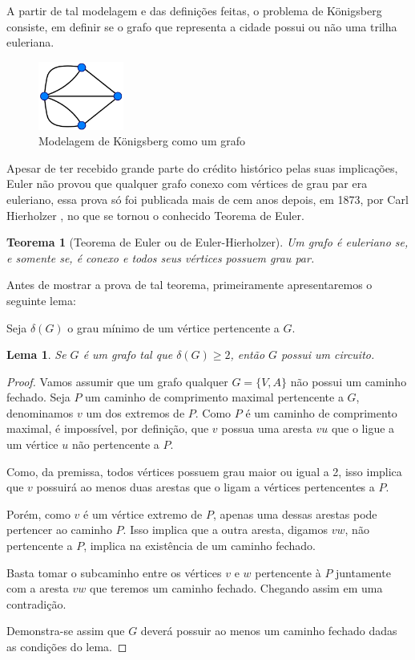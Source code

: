 \documentclass{article}
\newtheorem{theorem}{Teorema}[section]
\newtheorem{lemma}{Lema}
\begin{document}
A partir de tal modelagem e das definições feitas, o problema de Königsberg consiste, em definir se o grafo que representa a cidade possui ou não uma trilha euleriana. 


\begin{figure}
    \centering
    \includegraphics[width=0.25\textwidth]{konigsberg-graph.png}
    \caption{Modelagem de Königsberg como um grafo}
    \label{konigsberg-graph}
\end{figure}

Apesar de ter recebido grande parte do crédito histórico pelas suas implicações, Euler não provou que qualquer grafo conexo com vértices de grau par era euleriano, essa prova só foi publicada mais de cem anos depois, em 1873, por Carl Hierholzer \cite{hierholzer}, no que se tornou o conhecido Teorema de Euler.


\begin{theorem}[Teorema de Euler ou de Euler-Hierholzer]
    Um grafo é euleriano se, e somente se, é conexo e todos seus vértices possuem grau par.
    \label{euler}
\end{theorem}

Antes de mostrar a prova de tal teorema, primeiramente apresentaremos o seguinte lema:

Seja $\delta(G)$ o grau mínimo de um vértice pertencente a $G$.

\begin{lemma}
	\label{lema}
	Se $G$ é um grafo tal que $\delta(G) \geq 2$, então $G$ possui um circuito.
\end{lemma}

\begin{proof}
	Vamos assumir que um grafo qualquer $G = \{V, A\}$ não possui um caminho fechado. 
	Seja $P$ um caminho de comprimento maximal pertencente a $G$, denominamos $v$ um dos extremos de $P$. 
	Como $P$ é um caminho de comprimento maximal, é impossível, por definição, que $v$ possua uma aresta $vu$ que o ligue a um vértice $u$ não pertencente a $P$.
	
	Como, da premissa, todos vértices possuem grau maior ou igual a 2, isso implica que $v$ possuirá ao menos duas arestas que o ligam a vértices pertencentes a $P$.

	Porém, como $v$ é um vértice extremo de $P$, apenas uma dessas arestas pode pertencer ao caminho $P$. Isso implica que a outra aresta, digamos $vw$, não pertencente a $P$, implica na existência de um caminho fechado.

	Basta tomar o subcaminho entre os vértices $v$ e $w$ pertencente à $P$ juntamente com a aresta $vw$ que teremos um caminho fechado. Chegando assim em uma contradição.

	Demonstra-se assim que $G$ deverá possuir ao menos um caminho fechado dadas as condições do lema.
\end{proof}
\end{document}
